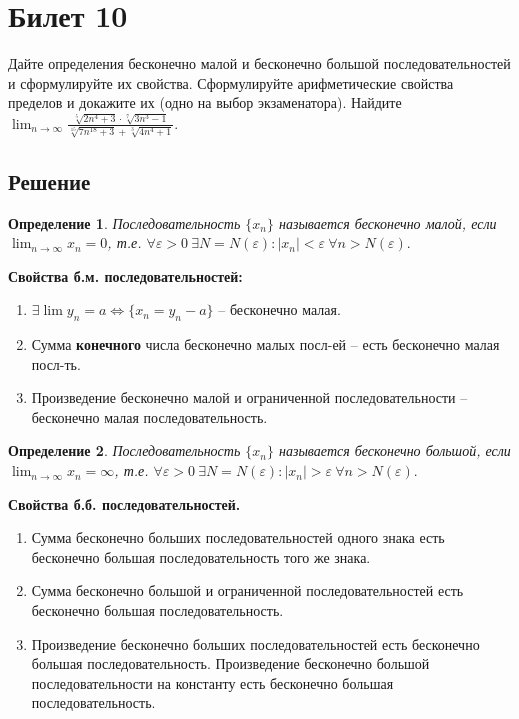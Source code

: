 \documentclass[a4paper,12pt]{article}
\newtheorem*{defi}{Определение}
\newcommand{\eps}{\varepsilon}
\begin{document}
    \section*{Билет 10}
    
    Дайте определения бесконечно малой и бесконечно большой последовательностей и сформулируйте их свойства. Сформулируйте арифметические свойства пределов и докажите их (одно на
выбор экзаменатора). Найдите $\displaystyle \lim_{n\rightarrow \infty} 
            \frac{
                   \sqrt[5]{2n^4 + 3} \cdot 
                   \sqrt[7]{3n^3 - 1}
                 }
                 {
                   \sqrt[15]{7n^{18} + 3} + 
                   \sqrt[3]{4n^4 + 1}
                 }.$
    
    \subsection*{Решение}
    
    \begin{defi} Последовательность $ \{ x_ n \} $ называется бесконечно малой, 
        если $\displaystyle \lim_{n \rightarrow \infty} x_n = 0$, т.е. 
        $\forall \eps > 0\ \exists N = N(\eps):|x_n| < \eps\ \forall n > N(\eps).$
    \end{defi}

    \textbf{Свойства б.м. последовательностей:}
        \begin{enumerate}
            \item $\exists \lim y_n = a \Leftrightarrow \{x_n = y_n - a\}$ -- бесконечно малая.
            \item Сумма \textbf{конечного} числа бесконечно малых посл-ей -- есть бесконечно малая посл-ть.
            \item Произведение бесконечно малой и ограниченной последовательности -- бесконечно малая последовательность.
        \end{enumerate}
    
    \begin{defi} Последовательность $ \{ x_ n \} $ называется бесконечно большой, 
        если $\displaystyle \lim_{n \rightarrow \infty} x_n = \infty$, т.е. 
        $\forall \eps > 0\ \exists N = N(\eps):|x_n| > \eps\ \forall n > N(\eps).$
    \end{defi}
    \textbf{Свойства б.б. последовательностей.}
        \begin{enumerate}
            \item Сумма бесконечно больших последовательностей одного знака есть бесконечно большая последовательность того же знака.
            \item Сумма бесконечно большой и ограниченной последовательностей есть бесконечно большая последовательность.
            \item Произведение бесконечно больших последовательностей есть бесконечно большая последовательность. Произведение бесконечно большой последовательности на константу есть бесконечно большая последовательность.
        \end{enumerate}
\end{document}
